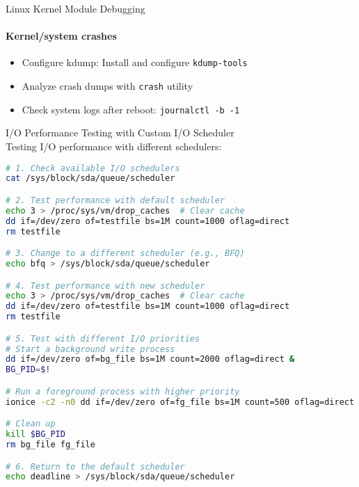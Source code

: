 \begin{KR}{Linux Kernel Module Debugging}
    \paragraph{Kernel/system crashes}
    \begin{itemize}
        \item Configure kdump: Install and configure \texttt{kdump-tools}
        \item Analyze crash dumps with \texttt{crash} utility
        \item Check system logs after reboot: \texttt{journalctl -b -1}
    \end{itemize}
\end{KR}

\begin{example2}{I/O Performance Testing with Custom I/O Scheduler}\\
    Testing I/O performance with different schedulers:
    
\begin{lstlisting}[language=bash, style=basesmol]
# 1. Check available I/O schedulers
cat /sys/block/sda/queue/scheduler

# 2. Test performance with default scheduler
echo 3 > /proc/sys/vm/drop_caches  # Clear cache
dd if=/dev/zero of=testfile bs=1M count=1000 oflag=direct
rm testfile

# 3. Change to a different scheduler (e.g., BFQ)
echo bfq > /sys/block/sda/queue/scheduler

# 4. Test performance with new scheduler
echo 3 > /proc/sys/vm/drop_caches  # Clear cache
dd if=/dev/zero of=testfile bs=1M count=1000 oflag=direct
rm testfile

# 5. Test with different I/O priorities
# Start a background write process
dd if=/dev/zero of=bg_file bs=1M count=2000 oflag=direct &
BG_PID=$!

# Run a foreground process with higher priority
ionice -c2 -n0 dd if=/dev/zero of=fg_file bs=1M count=500 oflag=direct

# Clean up
kill $BG_PID
rm bg_file fg_file

# 6. Return to the default scheduler
echo deadline > /sys/block/sda/queue/scheduler
\end{lstlisting}
\end{example2}